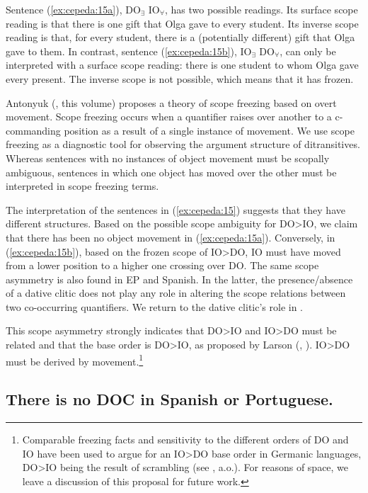 \documentclass[output=paper,colorlinks,citecolor=brown,nonflat]{./langscibook}
\begin{document}
Sentence (\ref{ex:cepeda:15a}), DO$_∃$ IO$_∀$, has two possible readings. Its surface scope reading is that there is one gift that Olga gave to every student. Its inverse scope reading is that, for every student, there is a (potentially different) gift that Olga gave to them. In contrast, sentence (\ref{ex:cepeda:15b}), IO$_∃$  DO$_∀$, can only be interpreted with a surface scope reading: there is one student to whom Olga gave every present. The inverse scope is not possible, which means that it has frozen.

Antonyuk (\citeyear{Antonyuk2015}, this volume) proposes a theory of scope freezing based on overt movement. Scope freezing occurs when a quantifier raises over another to a c-commanding position as a result of a single instance of movement. We use scope freezing as a diagnostic tool for observing the argument structure of ditransitives. Whereas sentences with no instances of object movement must be scopally ambiguous, sentences in which one object has moved over the other must be interpreted in scope freezing terms.

The interpretation of the sentences in (\ref{ex:cepeda:15}) suggests that they have different structures. Based on the possible scope ambiguity for DO>IO, we claim that there has been no object movement in (\ref{ex:cepeda:15a}). Conversely, in (\ref{ex:cepeda:15b}), based on the frozen scope of IO>DO, IO must have moved from a lower position to a higher one crossing over DO. The same scope asymmetry is also found in EP and Spanish. In the latter, the presence/absence of a dative clitic does not play any role in altering the scope relations between two co-occurring quantifiers. We return to the dative clitic’s role in .

This scope asymmetry strongly indicates that DO>IO and IO>DO must be related and that the base order is DO>IO, as proposed by Larson (\citeyear{Larson1988}, \citeyear{Larson2014}). IO>DO must be derived by movement.\footnote{Comparable freezing facts and sensitivity to the different orders of DO and IO have been used to argue for an IO>DO base order in Germanic languages, DO>IO being the result of scrambling (see \citealt{Abraham1986, Choi1996, Bacovcin2017}, a.o.). For reasons of space, we leave a discussion of this proposal for future work.}

\subsection{There is no DOC in Spanish or Portuguese.}\label{sec:cepeda:2.2}
\end{document}
